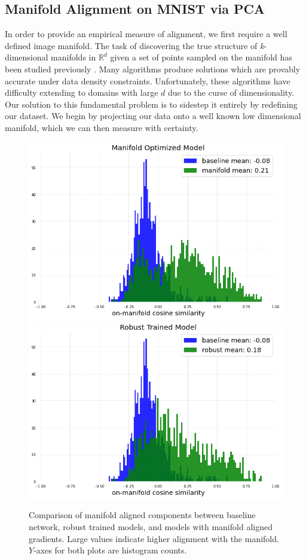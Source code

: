 \subsection{Manifold Alignment on MNIST via PCA} \label{subsec:mae}

In order to provide an empirical measure of alignment, we first require a well defined image manifold.
The task of discovering the true structure of \textit{k}-dimensional manifolds in $\mathds{R}^d$ given a set of points sampled on the manifold has been studied previously \citep{khoury2018}.
Many algorithms produce solutions which are provably accurate under data density constraints.
Unfortunately, these algorithms have difficulty extending to domains with large $d$ due to the curse of dimensionality.
Our solution to this fundamental problem is to sidestep it entirely by redefining our dataset.
We begin by projecting our data onto a well known low dimensional manifold, which we can then measure with certainty.
\begin{figure}[ht]
\begin{center}

    \includegraphics[width=0.45\linewidth]{c3_figures/manifold_model_cosine_hist.png}\includegraphics[width=0.45\linewidth]{c3_figures/robust_model_cosine_hist.png}
\end{center}
    \caption{Comparison of manifold aligned components between baseline network, robust trained models, and models with manifold aligned gradients. Large values indicate higher alignment with the manifold. $Y$-axes for both plots are histogram counts.}
    \label{fig:hist_cosine}
\end{figure}

